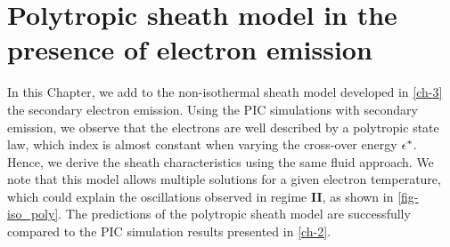 



\chapter{Polytropic sheath model in the presence of electron emission}
\label{ch-4}


\begin{Chabstract}
  
In this Chapter, we add to the non-isothermal sheath model developed in \cref{ch-3} the secondary electron emission.
Using the \ac{PIC} simulations with secondary emission, we observe that the electrons are well described by a polytropic state law, which index is almost constant when varying the cross-over energy $\epsilon^{*}$.
Hence, we derive the sheath characteristics using the same fluid approach.
We note that this model allows multiple solutions for a given electron temperature, which could explain the oscillations observed in regime {\bf II}, as shown in \cref{fig-iso_poly}.
The predictions of the polytropic sheath model are successfully compared to the \ac{PIC} simulation results presented in \cref{ch-2}.
\end{Chabstract}

% 
% 
% 
% 
% 

